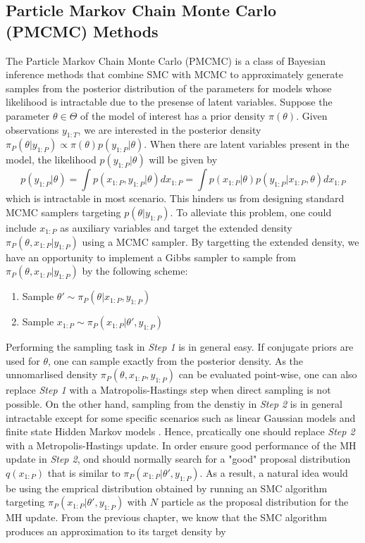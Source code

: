 \documentclass[12pt,a4paper]{article}
\begin{document}
\subsection{Particle Markov Chain Monte Carlo (PMCMC) Methods }
The Particle Markov Chain Monte Carlo (PMCMC) is a class of Bayesian inference methods that combine SMC with MCMC to approximately generate samples from the posterior distribution of the parameters for models whose likelihood is intractable due to the presense of latent variables. Suppose the parameter $\theta \in \Theta$ of the model of interest has a prior density $\pi(\theta)$. Given observations $y_{1:T}$, we are interested in the posterior density $\pi_P(\theta|y_{1:P}) \propto \pi(\theta)p(y_{1:P}|\theta)$. When there are latent variables present in the model, the likelihood $p(y_{1:P}|\theta)$ will be given by 
\begin{equation}
    \label{PMCMC-marginal likelihood}
    p(y_{1:P}|\theta) = \int p(x_{1:P},y_{1:P}|\theta)dx_{1:P} = \int p(x_{1:P}|\theta) p(y_{1:P}|x_{1:P},\theta) dx_{1:P}
\end{equation}
which is intractable in most scenario. This hinders us from designing standard MCMC samplers targeting $p(\theta|y_{1:P})$. To alleviate this problem, one could include $x_{1:P}$ as auxiliary variables and target the extended density $\pi_P(\theta,x_{1:P}|y_{1:P})$ using a MCMC sampler. By targetting the extended density, we have an opportunity to implement a Gibbs sampler to sample from $\pi_P(\theta,x_{1:P}|y_{1:P})$ by the following scheme:
\begin{enumerate}[label=\textit{Step \arabic*.},leftmargin=*]
    \item Sample $\theta' \sim \pi_P(\theta|x_{1:P},y_{1:P})$
    \item Sample $x_{1:P} \sim \pi_P(x_{1:P}|\theta',y_{1:P})$
\end{enumerate}
Performing the sampling task in \textit{Step 1} is in general easy. If conjugate priors are used for $\theta$, one can sample exactly from the posterior density. As the unnomarlised density $\pi_P(\theta,x_{1:P},y_{1:P})$ can be evaluated point-wise, one can also replace \textit{Step 1} with a Matropolis-Hastings step when direct sampling is not possible. On the other hand, sampling from the denstiy in \textit{Step 2} is in general intractable except for some specific scenarios such as linear Gaussian models and finite state Hidden Markov models \citep{andrieu2010particle}. Hence, prcatically one should replace \textit{Step 2} with a Metropolis-Hastings update. In order ensure good performance of the MH update in \textit{Step 2}, ond should normally search for a "good" proposal distribution $q(x_{1:P})$ that is similar to $\pi_P(x_{1:P}|\theta',y_{1:P})$. As a result, a natural idea would be using the emprical distribution obtained by running an SMC algorithm targeting $\pi_P(x_{1:P}|\theta',y_{1:P})$ with $N$ particle as the proposal distribution for the MH update. From the previous chapter, we know that the SMC algorithm produces an approximation to its target density by
\end{document}
